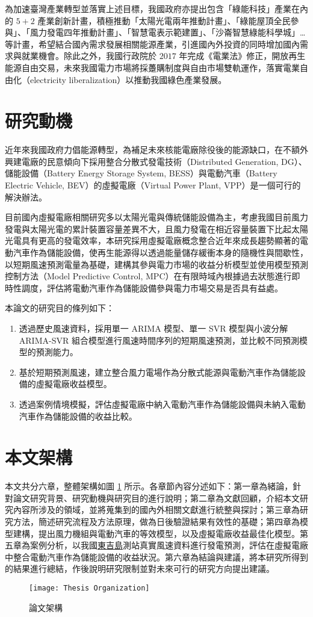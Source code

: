 為加速臺灣產業轉型並落實上述目標，我國政府亦提出包含「綠能科技」產業在內的 $5+2$ 產業創新計畫，積極推動「太陽光電兩年推動計畫」、「綠能屋頂全民參與」、「風力發電四年推動計畫」、「智慧電表示範建置」、「沙崙智慧綠能科學城」…等計畫，希望結合國內需求發展相關能源產業，引進國內外投資的同時增加國內需求與就業機會。除此之外，我國行政院於 $2017$ 年完成《電業法》修正，開放再生能源自由交易，未來我國電力市場將採躉購制度與自由市場雙軌運作，落實電業自由化（electricity liberalization）以推動我國綠色產業發展。

\section{研究動機}

近年來我國政府力倡能源轉型，為補足未來核能電廠除役後的能源缺口，在不額外興建電廠的民意傾向下採用整合分散式發電技術（Distributed Generation, DG）、儲能設備（Battery Energy Storage System, BESS）與電動汽車（Battery Electric Vehicle, BEV）的虛擬電廠（Virtual Power Plant, VPP）是一個可行的解決辦法。

目前國內虛擬電廠相關研究多以太陽光電與傳統儲能設備為主，考慮我國目前風力發電與太陽光電的累計裝置容量差異不大，且風力發電在相近容量裝置下比起太陽光電具有更高的發電效率，本研究採用虛擬電廠概念整合近年來成長趨勢顯著的電動汽車作為儲能設備，使再生能源得以透過能量儲存緩衝本身的隨機性與間歇性，以短期風速預測電量為基礎，建構其參與電力市場的收益分析模型並使用模型預測控制方法（Model Predictive Control, MPC）在有限時域內根據過去狀態進行即時性調度，評估將電動汽車作為儲能設備參與電力市場交易是否具有益處。

本論文的研究目的條列如下：

\begin{enumerate}
  \item 透過歷史風速資料，採用單一 ARIMA 模型、單一 SVR 模型與小波分解 ARIMA-SVR 組合模型進行風速時間序列的短期風速預測，並比較不同預測模型的預測能力。
  \item 基於短期預測風速，建立整合風力電場作為分散式能源與電動汽車作為儲能設備的虛擬電廠收益模型。
  \item 透過案例情境模擬，評估虛擬電廠中納入電動汽車作為儲能設備與未納入電動汽車作為儲能設備的收益比較。
\end{enumerate}

\section{本文架構}

本文共分六章，整體架構如圖 \ref{figure: Thesis Organization} 所示。各章節內容分述如下：第一章為緒論，針對論文研究背景、研究動機與研究目的進行說明；第二章為文獻回顧，介紹本文研究內容所涉及的領域，並將蒐集到的國內外相關文獻進行統整與探討；第三章為研究方法，簡述研究流程及方法原理，做為日後驗證結果有效性的基礎；第四章為模型建構，提出風力機組與電動汽車的等效模型，以及虛擬電廠收益最佳化模型。第五章為案例分析，以我國\uline{東吉島}測站真實風速資料進行發電預測，評估在虛擬電廠中整合電動汽車作為儲能設備的收益狀況。第六章為結論與建議，將本研究所得到的結果進行總結，作後說明研究限制並對未來可行的研究方向提出建議。

\begin{figure}[htbp]
  \centering
  \texttt{[image: Thesis Organization]}
  \caption[論文架構]{論文架構}
  \label{figure: Thesis Organization}
\end{figure}